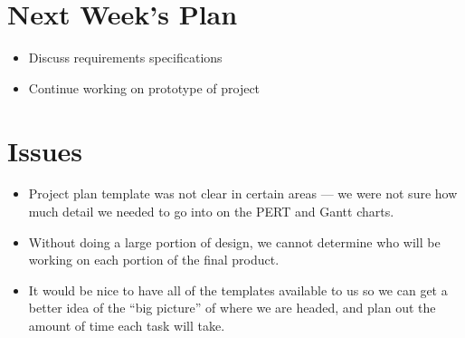\section{Next Week's Plan}
\begin{itemize}
	\item Discuss requirements specifications
	\item Continue working on prototype of project
\end{itemize}

%
%
%
\section{Issues}
\begin{itemize}
	\item Project plan template was not clear in certain areas ---
	we were not sure how much detail we needed to go into on the
	PERT and Gantt charts.

	\item Without doing a large portion of design, we cannot
	determine who will be working on each portion of the
	final product.

	\item It would be nice to have all of the templates available
	to us so we can get a better idea of the ``big picture'' of
	where we are headed, and plan out the amount of time each task
	will take.
\end{itemize}


